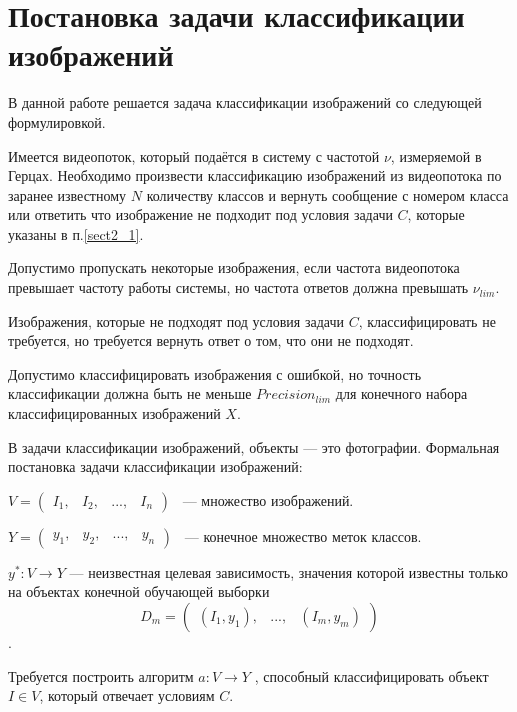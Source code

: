 \section{Постановка задачи классификации изображений}\label{sect2_2}

В данной работе решается задача классификации изображений со следующей формулировкой. 

Имеется видеопоток, который подаётся в систему с частотой $\nu$, измеряемой в Герцах. Необходимо произвести классификацию изображений из видеопотока по заранее известному $N$ количеству классов и вернуть сообщение с номером класса или ответить что изображение не подходит под условия задачи $C$, которые указаны в п.\ref{sect2_1}. 

Допустимо пропускать некоторые изображения, если частота видеопотока превышает частоту работы системы, но частота ответов должна превышать $\nu_{lim}$. 

Изображения, которые не подходят под условия задачи $C$, классифицировать не требуется, но требуется вернуть ответ о том, что они не подходят. 

Допустимо классифицировать изображения с ошибкой, но точность классификации должна быть не меньше $Precision_{lim}$ для конечного набора классифицированных изображений $X$.

В задачи классификации изображений, объекты — это фотографии. Формальная постановка задачи классификации изображений:

$ V = \begin{pmatrix} 
             I_1, & I_2, & ..., & I_n 
      \end{pmatrix}
$
~— множество изображений. 

$ Y = \begin{pmatrix}
                  y_1, & y_2, & ..., & y_n 
      \end{pmatrix}
$
~— конечное множество меток классов.

$y^{*} : V \rightarrow Y$ — неизвестная целевая зависимость, значения которой известны только на объектах конечной обучающей выборки 
\begin{equation} D_m = 
        \begin{pmatrix}
             (I_1, y_1), & ..., & (I_m, y_m)
        \end{pmatrix}
\end{equation}.

Требуется построить алгоритм $a : V \rightarrow Y$ , способный классифицировать объект $I \in V$, который отвечает условиям $C$.


